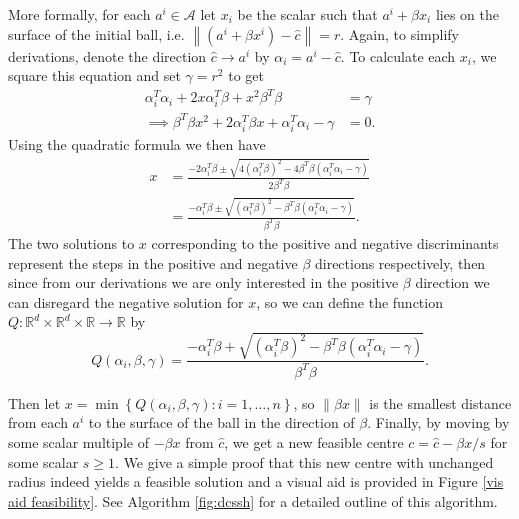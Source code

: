 \documentclass[11pt,twoside]{report}
\newcommand{\A}{\mathcal{A}} %
\newcommand{\norm}[1]{\left\lVert#1\right\rVert} %
\theoremstyle{definition}
\numberwithin{theorem}{section}
\numberwithin{definition}{section}
\numberwithin{lemma}{section}
\numberwithin{proposition}{section}
\numberwithin{equation}{section}
\numberwithin{figure}{section}
\begin{document}
More formally, for each $a^i\in\A$ let $x_i$ be the scalar such that $a^i+\beta x_i$ lies on the surface of the initial ball, i.e. $\norm{(a^i+\beta x^i)-\hat{c}}=r$. Again, to simplify derivations, denote the direction $\hat{c}\to a^i$ by $\alpha_i=a^i-\hat{c}$. To calculate each $x_i$, we square this equation and set $\gamma=r^2$ to get
\begin{align*}
    \alpha_i^T\alpha_i + 2x\alpha_i^T\beta + x^2\beta^T\beta &= \gamma \\
    \implies \beta^T\beta x^2 + 2\alpha_i^T\beta x + \alpha_i^T\alpha_i - \gamma &= 0.
\end{align*}
Using the quadratic formula we then have
\begin{align*}
    x &= \frac{-2\alpha_i^T\beta \pm \sqrt{4\left(\alpha_i^T\beta\right)^2 - 4\beta^T \beta\left(\alpha_i^T\alpha_i-\gamma\right)}}{2\beta^T\beta} \\[4pt]
    &= \frac{-\alpha_i^T\beta \pm \sqrt{\left(\alpha_i^T\beta\right)^2 - \beta^T \beta\left(\alpha_i^T\alpha_i-\gamma\right)}}{\beta^T\beta}.
\end{align*}
The two solutions to $x$ corresponding to the positive and negative discriminants represent the steps in the positive and negative $\beta$ directions respectively, then since from our derivations we are only interested in the positive $\beta$ direction we can disregard the negative solution for $x$, so we can define the function $Q:\mathbb{R}^d\times\mathbb{R}^d\times\mathbb{R}\to\mathbb{R}$ by
\begin{equation*}
    Q(\alpha_i,\beta,\gamma) = \frac{-\alpha_i^T\beta + \sqrt{\left(\alpha_i^T\beta\right)^2 - \beta^T \beta\left(\alpha_i^T\alpha_i-\gamma\right)}}{\beta^T\beta}.
\end{equation*}


Then let $x=\min\left\{Q(\alpha_i, \beta, \gamma):i=1,\ldots,n\right\}$, so $\norm{\beta x}$ is the smallest distance from each $a^i$ to the surface of the ball in the direction of $\beta$. Finally, by moving by some scalar multiple of $-\beta x$ from $\hat{c}$, we get a new feasible centre $c=\hat{c}-\beta x/s$ for some scalar $s\geq1$. We give a simple proof that this new centre with unchanged radius indeed yields a feasible solution and a visual aid is provided in Figure \ref{vis aid feasibility}. See Algorithm \ref{fig:dcssh} for a detailed outline of this algorithm.
\end{document}
